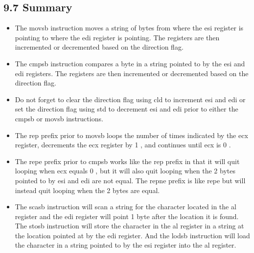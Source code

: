 \documentclass[10pt]{article}
\begin{document}
\subsection*{9.7 Summary}
\begin{itemize}
  \item The movsb instruction moves a string of bytes from where the esi register is pointing to where the edi register is pointing. The registers are then incremented or decremented based on the direction flag.
  \item The cmpsb instruction compares a byte in a string pointed to by the esi and edi registers. The registers are then incremented or decremented based on the direction flag.
  \item Do not forget to clear the direction flag using cld to increment esi and edi or set the direction flag using std to decrement esi and edi prior to either the cmpsb or movsb instructions.
  \item The rep prefix prior to movsb loops the number of times indicated by the ecx register, decrements the ecx register by 1 , and continues until ecx is 0 .
  \item The repe prefix prior to cmpsb works like the rep prefix in that it will quit looping when ecx equals 0 , but it will also quit looping when the 2 bytes pointed to by esi and edi are not equal. The repne prefix is like repe but will instead quit looping when the 2 bytes are equal.
  \item The scasb instruction will scan a string for the character located in the al register and the edi register will point 1 byte after the location it is found. The stosb instruction will store the character in the al register in a string at the location pointed at by the edi register. And the lodsb instruction will load the character in a string pointed to by the esi register into the al register.
\end{itemize}
\end{document}
